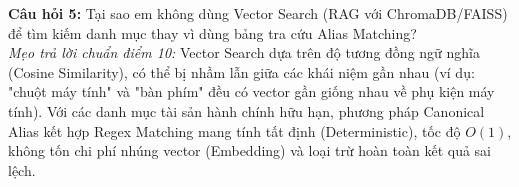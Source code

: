 \begin{checkpointbox}
\textbf{Câu hỏi 5:} Tại sao em không dùng Vector Search (RAG với ChromaDB/FAISS) để tìm kiếm danh mục thay vì dùng bảng tra cứu Alias Matching?\\
\textit{Mẹo trả lời chuẩn điểm 10:} Vector Search dựa trên độ tương đồng ngữ nghĩa (Cosine Similarity), có thể bị nhầm lẫn giữa các khái niệm gần nhau (ví dụ: "chuột máy tính" và "bàn phím" đều có vector gần giống nhau về phụ kiện máy tính). Với các danh mục tài sản hành chính hữu hạn, phương pháp Canonical Alias kết hợp Regex Matching mang tính tất định (Deterministic), tốc độ $O(1)$, không tốn chi phí nhúng vector (Embedding) và loại trừ hoàn toàn kết quả sai lệch.
\end{checkpointbox}

